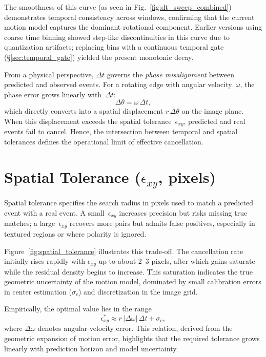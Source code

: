 The smoothness of this curve (as seen in Fig.~\ref{fig:dt_sweep_combined}) demonstrates temporal consistency across windows, confirming that the current motion model captures the dominant rotational component.
Earlier versions using coarse time binning showed step-like discontinuities in this curve due to quantization artifacts; replacing bins with a continuous temporal gate (\S\ref{sec:temporal_gate}) yielded the present monotonic decay.

From a physical perspective, \(\Delta t\) governs the \textit{phase misalignment} between predicted and observed events.
For a rotating edge with angular velocity~\(\omega\), the phase error grows linearly with~\(\Delta t\):
\[
\Delta \theta = \omega \, \Delta t,
\]
which directly converts into a spatial displacement \(r\,\Delta\theta\) on the image plane.
When this displacement exceeds the spatial tolerance~\(\epsilon_{xy}\), predicted and real events fail to cancel.
Hence, the intersection between temporal and spatial tolerances defines the operational limit of effective cancellation.

\section{Spatial Tolerance (\( \epsilon_{xy} \), pixels)}
\label{sec:spatial_tolerance}

Spatial tolerance specifies the search radius in pixels used to match a predicted event with a real event.
A small~\(\epsilon_{xy}\) increases precision but risks missing true matches; a large~\(\epsilon_{xy}\) recovers more pairs but admits false positives, especially in textured regions or where polarity is ignored.

Figure~\ref{fig:spatial_tolerance} illustrates this trade-off.
The cancellation rate initially rises rapidly with \(\epsilon_{xy}\) up to about 2–3 pixels, after which gains saturate while the residual density begins to increase.
This saturation indicates the true geometric uncertainty of the motion model, dominated by small calibration errors in center estimation (\(\sigma_c\)) and discretization in the image grid.

Empirically, the optimal value lies in the range
\[
\epsilon_{xy}^{*} \approx r\,|\Delta\omega|\,\Delta t + \sigma_c,
\]
where \(\Delta\omega\) denotes angular-velocity error.
This relation, derived from the geometric expansion of motion error, highlights that the required tolerance grows linearly with prediction horizon and model uncertainty.

